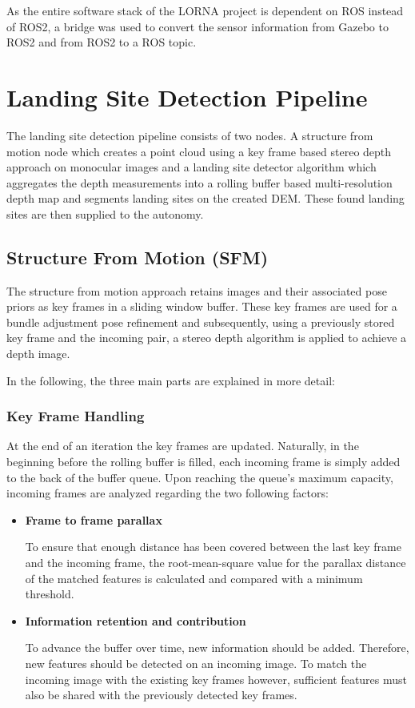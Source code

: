 As the entire software stack of the LORNA project is dependent on ROS instead of ROS2, a bridge was used to convert the sensor information from Gazebo to ROS2 and from ROS2 to a ROS topic.


\section{Landing Site Detection Pipeline}\label{sec:setup:LSP}

The landing site detection pipeline consists of two nodes. A structure from motion node \citep{SFM} which creates a point cloud using a key frame based stereo depth approach on monocular images and a landing site detector algorithm \citep{LSD1, LSD2} which aggregates the depth measurements into a rolling buffer based multi-resolution depth map and segments landing sites on the created DEM. These found landing sites are then supplied to the autonomy. 

\subsection{Structure From Motion (SFM)}\label{subsec:setup:SFM}

The structure from motion approach retains images and their associated pose priors as key frames in a sliding window buffer. These key frames are used for a bundle adjustment pose refinement and subsequently, using a previously stored key frame and the incoming pair, a stereo depth algorithm is applied to achieve a depth image. 

In the following, the three main parts are explained in more detail:

\subsubsection{Key Frame Handling}

At the end of an iteration the key frames are updated. Naturally, in the beginning before the rolling buffer is filled, each incoming frame is simply added to the back of the buffer queue. Upon reaching the queue's maximum capacity, incoming frames are analyzed regarding the two following factors:

\begin{itemize}
    \item \textbf{Frame to frame parallax}

    To ensure that enough distance has been covered between the last key frame and the incoming frame, the root-mean-square value for the parallax distance of the matched features is calculated and compared with a minimum threshold.
    \item \textbf{Information retention and contribution}

    To advance the buffer over time, new information should be added. Therefore, new features should be detected on an incoming image. To match the incoming image with the existing key frames however, sufficient features must also be shared with the previously detected key frames.
\end{itemize}

